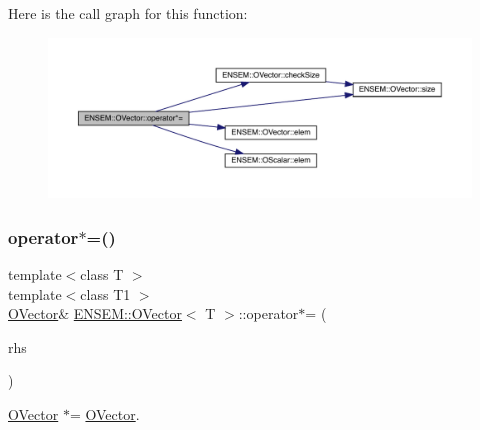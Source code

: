Here is the call graph for this function\+:
\nopagebreak
\begin{figure}[H]
\begin{center}
\leavevmode
\includegraphics[width=350pt]{d0/d8d/classENSEM_1_1OVector_a55710cffaf6c877d2465af80ad8b6c49_cgraph}
\end{center}
\end{figure}
\mbox{\label{classENSEM_1_1OVector_ab1d7773b4a23e20961ece98c90b915b4}} 
\subsubsection{\texorpdfstring{operator$\ast$=()}{operator*=()}\hspace{0.1cm}{\footnotesize\ttfamily [4/6]}}
{\footnotesize\ttfamily template$<$class T $>$ \\
template$<$class T1 $>$ \\
\mbox{\hyperlink{classENSEM_1_1OVector}{O\+Vector}}\& \mbox{\hyperlink{classENSEM_1_1OVector}{E\+N\+S\+E\+M\+::\+O\+Vector}}$<$ T $>$\+::operator$\ast$= (\begin{DoxyParamCaption}\item[{const \mbox{\hyperlink{classENSEM_1_1OVector}{O\+Vector}}$<$ T1 $>$ \&}]{rhs }\end{DoxyParamCaption})\hspace{0.3cm}{\ttfamily [inline]}}



\mbox{\hyperlink{classENSEM_1_1OVector}{O\+Vector}} $\ast$= \mbox{\hyperlink{classENSEM_1_1OVector}{O\+Vector}}. 

